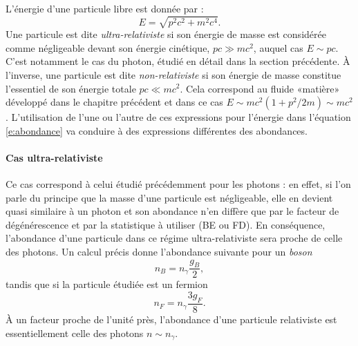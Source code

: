 L'énergie d'une particule libre est donnée par :
\begin{equation}
E=\sqrt{p^2c^2+m^2c^4}.
\end{equation}
 Une particule est dite \textit{ultra-relativiste} si son énergie de masse est considérée comme négligeable devant son énergie cinétique, $pc\gg mc^2$, auquel cas $E\sim pc$. C'est notamment le cas du photon, étudié en détail dans la section précédente. À l'inverse, une particule est dite \textit{non-relativiste} si son énergie de masse constitue l'essentiel de son énergie totale $pc \ll mc^2$. Cela correspond au fluide «matière» développé dans le chapitre précédent et dans ce cas $E\sim mc^2 (1+ p^2/2m) \sim mc^2$. L'utilisation de l'une ou l'autre de ces expressions pour l'énergie dans l'équation \ref{e:abondance} va conduire à des expressions différentes des abondances.
 
 \paragraph{Cas ultra-relativiste}
Ce cas correspond à celui étudié précédemment pour les photons : en effet, si l'on parle du principe que la masse d'une particule est négligeable, elle en devient quasi similaire à un photon et son abondance n'en diffère que par le facteur de dégénérescence et par la statistique à utiliser (BE ou FD). En conséquence, l'abondance d'une particule dans ce régime ultra-relativiste sera proche de celle des photons. Un calcul précis donne l'abondance suivante pour un \textit{boson}
\begin{equation}
n_B=n_\gamma\frac{g_B}{2},
\end{equation}
tandis que si la particule étudiée est un fermion
\begin{equation}
n_F=n_\gamma\frac{3g_F}{8}.
\end{equation}
À un facteur proche de l'unité près, l'abondance d'une particule relativiste est essentiellement celle des photons $n\sim n_\gamma$.

